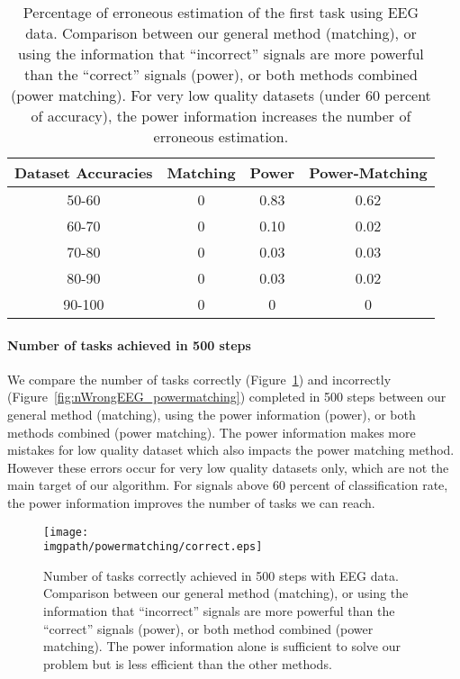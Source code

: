 \begin{table}
\centering
{}
\begin{tabular}{c c c c}
    Dataset Accuracies & Matching & Power & Power-Matching \\ \hline
    50-60 & 0 & 0.83 & 0.62 \\ 
    60-70 & 0 & 0.10 & 0.02 \\
    70-80 & 0 & 0.03 & 0.03 \\
    80-90 & 0 & 0.03 & 0.02 \\
    90-100 & 0 & 0 & 0 \\
\end{tabular}
\caption{Percentage of erroneous estimation of the first task using EEG data. Comparison between our general method (matching), or using the information that ``incorrect'' signals are more powerful than the ``correct'' signals (power), or both methods combined (power matching). For very low quality datasets (under 60 percent of accuracy), the power information increases the number of erroneous estimation.}
\label{tab:errorTaskRatio}
\end{table}


\paragraph{Number of tasks achieved in 500 steps}

We compare the number of tasks correctly (Figure~\ref{fig:nCorrect_powermatching}) and incorrectly (Figure~\ref{fig:nWrongEEG_powermatching}) completed in 500 steps between our general method (matching), using the power information (power), or both methods combined (power matching). The power information makes more mistakes for low quality dataset which also impacts the power matching method. However these errors occur for very low quality datasets only, which are not the main target of our algorithm. For signals above 60 percent of classification rate, the power information improves the number of tasks we can reach. 

\begin{figure}[!htbp]
\centering
\texttt{[image: \\imgpath/powermatching/correct.eps]}
\caption{Number of tasks correctly achieved in 500 steps with EEG data. Comparison between our general method (matching), or using the information that ``incorrect'' signals are more powerful than the ``correct'' signals (power), or both method combined (power matching). The power information alone is sufficient to solve our problem but is less efficient than the other methods.}
\label{fig:nCorrect_powermatching}
\end{figure} 

